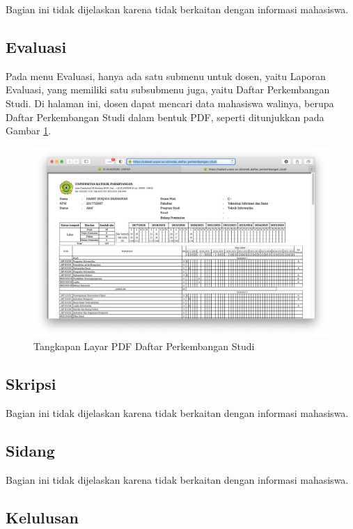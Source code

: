 Bagian ini tidak dijelaskan karena tidak berkaitan dengan informasi mahasiswa.

\subsection{Evaluasi}

Pada menu Evaluasi, hanya ada satu submenu untuk dosen, yaitu Laporan Evaluasi, yang memiliki satu subsubmenu juga, yaitu Daftar Perkembangan Studi. Di halaman ini, dosen dapat mencari data mahasiswa walinya, berupa Daftar Perkembangan Studi dalam bentuk PDF, seperti ditunjukkan pada Gambar \ref{fig:3_siakad_dps_detail}.

\begin{figure}[H]
    \centering
    \includegraphics[scale=0.35]{Gambar/siakad_dps_detail.png}
    \caption{Tangkapan Layar PDF Daftar Perkembangan Studi}
    \label{fig:3_siakad_dps_detail}
\end{figure}
\subsection{Skripsi}

Bagian ini tidak dijelaskan karena tidak berkaitan dengan informasi mahasiswa.

\subsection{Sidang}

Bagian ini tidak dijelaskan karena tidak berkaitan dengan informasi mahasiswa.

\subsection{Kelulusan}

